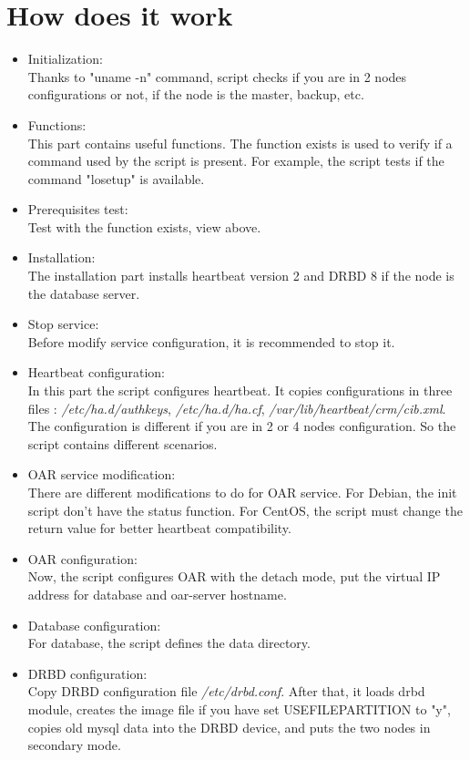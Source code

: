 \documentclass[a4paper,10pt]{report}
\begin{document}
\section{How does it work}
\begin{itemize}
 \item Initialization: \\
Thanks to "uname -n" command, script checks if you are in 2 nodes configurations or not, if the node is the master, backup, etc.
 \item Functions:\\
This part contains useful functions. The function exists is used to verify if a command used by the script is present. For example, the script tests if the command "losetup" is available.
 \item Prerequisites test:\\
Test with the function exists, view above.
 \item Installation:\\
The installation part installs heartbeat version 2 and DRBD 8 if the node is the database server.
 \item Stop service:\\
Before modify service configuration, it is recommended to stop it.
 \item Heartbeat configuration:\\
In this part the script configures heartbeat. It copies configurations in three files : \textit{/etc/ha.d/authkeys}, \textit{/etc/ha.d/ha.cf}, \textit{/var/lib/heartbeat/crm/cib.xml}. The configuration is different if you are in 2 or 4 nodes configuration. So the script contains different scenarios.
 \item OAR service modification:\\
There are different modifications to do for OAR service. For Debian, the init script don't have the status function. For CentOS, the script must change the return value for better heartbeat compatibility.
 \item OAR configuration:\\
Now, the script configures OAR with the detach mode, put the virtual IP address for database and oar-server hostname.
 \item Database configuration:\\
For database, the script defines the data directory.
 \item DRBD configuration:\\
Copy DRBD configuration file \textit{/etc/drbd.conf}. After that, it loads drbd module, creates the image file if you have set USEFILEPARTITION to "y", copies old mysql data into the DRBD device, and puts the two nodes in secondary mode.

\end{itemize}
\end{document}
